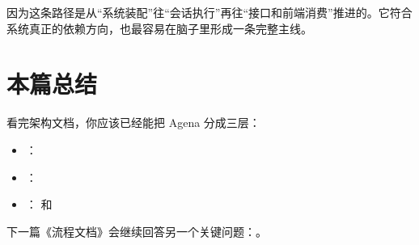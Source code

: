 \documentclass[11pt,a4paper]{ctexart}
\begin{document}
\begin{notebox}[为什么是这个顺序]
因为这条路径是从“系统装配”往“会话执行”再往“接口和前端消费”推进的。它符合系统真正的依赖方向，也最容易在脑子里形成一条完整主线。
\end{notebox}

\section{本篇总结}

看完架构文档，你应该已经能把 Agena 分成三层：

\begin{itemize}
  \item {}：
  \item {}：
  \item {}： 和 
\end{itemize}

下一篇《流程文档》会继续回答另一个关键问题：。
\end{document}
